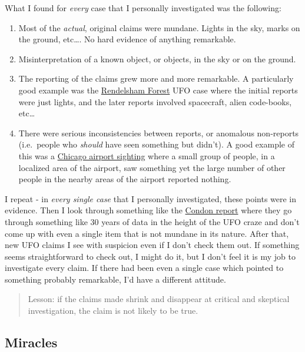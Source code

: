 What I found for \emph{every} case that I personally investigated was
the following:

\begin{enumerate}
\def\labelenumi{\arabic{enumi}.}
\itemsep1pt\parskip0pt
\item
  Most of the \emph{actual}, original claims were mundane. Lights in the
  sky, marks on the ground, etc\ldots{}. No hard evidence of anything
  remarkable.
\item
  Misinterpretation of a known object, or objects, in the sky or on the
  ground.
\item
  The reporting of the claims grew more and more remarkable. A
  particularly good example was the
  \href{http://en.wikipedia.org/wiki/Rendlesham_Forest_incident}{Rendelsham
  Forest} UFO case where the initial reports were just lights, and the
  later reports involved spacecraft, alien code-books, etc\ldots{}
\item
  There were serious inconsistencies between reports, or anomalous
  non-reports (i.e.~people who \emph{should} have seen something but
  didn't). A good example of this was a
  \href{http://en.wikipedia.org/wiki/2006_O'Hare_International_Airport_UFO_sighting}{Chicago
  airport sighting} where a small group of people, in a localized area
  of the airport, saw something yet the large number of other people in
  the nearby areas of the airport reported nothing.
\end{enumerate}

I repeat - in \emph{every single case} that I personally investigated,
these points were in evidence. Then I look through something like the
\href{http://files.ncas.org/condon/text/contents.htm}{Condon report}
where they go through something like 30 years of data in the height of
the UFO craze and don't come up with even a single item that is not
mundane in its nature. After that, new UFO claims I see with suspicion
even if I don't check them out. If something seems straightforward to
check out, I might do it, but I don't feel it is my job to investigate
every claim. If there had been even a single case which pointed to
something probably remarkable, I'd have a different attitude.

\begin{quote}
Lesson: if the claims made shrink and disappear at critical and
skeptical investigation, the claim is not likely to be true.
\end{quote}

\subsection{Miracles}\label{pandoc-miracles}

